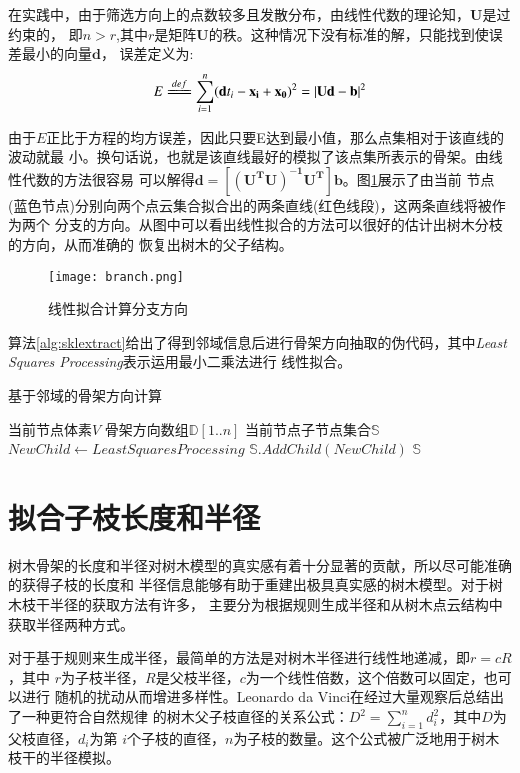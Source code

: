在实践中，由于筛选方向上的点数较多且发散分布，由线性代数的理论知，$\mathbf{U}$是过约束的，
即$n>r$,其中$r$是矩阵$\mathbf{U}$的秩。这种情况下没有标准的解，只能找到使误差最小的向量$\mathbf{d}$，
误差定义为:\\
\begin{equation}
	E\xlongequal{def} \sum_{i=1}^n(\mathbf{d}t_i - \mathbf{x_i} + \mathbf{x_0})^2=|\mathbf{Ud}-\mathbf{b}|^2
\end{equation}

由于$E$正比于方程的均方误差，因此只要E达到最小值，那么点集相对于该直线的波动就最
小。换句话说，也就是该直线最好的模拟了该点集所表示的骨架。由线性代数的方法很容易
可以解得$\mathbf{d}=\mathbf{[(U^TU)^{-1}U^T]b}$。图\ref{fig:fitting}展示了由当前
节点(蓝色节点)分别向两个点云集合拟合出的两条直线(红色线段)，这两条直线将被作为两个
分支的方向。从图中可以看出线性拟合的方法可以很好的估计出树木分枝的方向，从而准确的
恢复出树木的父子结构。

\begin{figure}[H]
	\centering
	\texttt{[image: branch.png]}
	\caption{线性拟合计算分支方向}
	\label{fig:fitting}
\end{figure}

算法\ref{alg:sklextract}给出了得到邻域信息后进行骨架方向抽取的伪代码，其中\textit{Least Squares Processing}表示运用最小二乘法进行
线性拟合。

\begin{algorithm}[H]
	\caption{基于邻域的骨架方向计算}
	\label{alg:sklextract}
	\begin{algorithmic}[1] 
		\Require 当前节点体素$V$
		\Require 骨架方向数组$\mathbb{D}[1..n]$
		\Ensure 当前节点子节点集合$\mathbb{S}$
			\State $NewChild\gets Least Squares Processing$
			\State $\mathbb{S}.AddChild(NewChild)$
		\EndFor
		\State \Return $\mathbb{S}$
	\end{algorithmic}
\end{algorithm}

\section{拟合子枝长度和半径}
树木骨架的长度和半径对树木模型的真实感有着十分显著的贡献，所以尽可能准确的获得子枝的长度和
半径信息能够有助于重建出极具真实感的树木模型。对于树木枝干半径的获取方法有许多，
主要分为根据规则生成半径和从树木点云结构中获取半径两种方式。

对于基于规则来生成半径，最简单的方法是对树木半径进行线性地递减，即$r=cR$，其中
$r$为子枝半径，$R$是父枝半径，$c$为一个线性倍数，这个倍数可以固定，也可以进行
随机的扰动从而增进多样性。Leonardo da Vinci在经过大量观察后总结出了一种更符合自然规律
的树木父子枝直径的关系公式：$D^2=\sum_{i=1}^n{d_i^2}$，其中$D$为父枝直径，$d_i$为第
$i$个子枝的直径，$n$为子枝的数量。这个公式被广泛地用于树木枝干的半径模拟。


